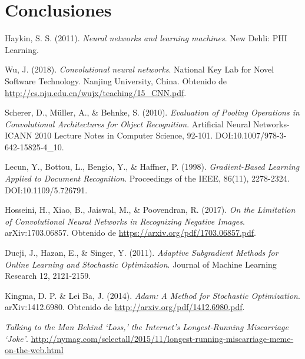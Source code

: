 \documentclass[spanish,11pt,letterpaper]{article}
\begin{document}
\section{Conclusiones}

\begin{thebibliography}{9}
Haykin, S. S. (2011).
\textit{Neural networks and learning machines}.
New Dehli: PHI Learning.

Wu, J. (2018).
\textit{Convolutional neural networks}.
National Key Lab for Novel Software Technology. Nanjing University, China.
Obtenido de \url{http://cs.nju.edu.cn/wujx/teaching/15_CNN.pdf}.

Scherer, D., M\"uller, A., \& Behnke, S. (2010).
\textit{Evaluation of Pooling Operations in Convolutional Architectures for Object Recognition}.
Artificial Neural Networks-ICANN 2010 Lecture Notes in Computer Science, 92-101. DOI:10.1007/978-3-642-15825-4\_10.

Lecun, Y., Bottou, L., Bengio, Y., \& Haffner, P. (1998).
\textit{Gradient-Based Learning Applied to Document Recognition}.
Proceedings of the IEEE, 86(11), 2278-2324. DOI:10.1109/5.726791.

Hosseini, H., Xiao, B., Jaiswal, M., \& Poovendran, R. (2017).
\textit{On the Limitation of Convolutional Neural Networks in Recognizing Negative Images}.
arXiv:1703.06857. Obtenido de \url{https://arxiv.org/pdf/1703.06857.pdf}.

Ducji, J., Hazan, E., \& Singer, Y. (2011).
\textit{Adaptive Subgradient Methods for Online Learning and Stochastic Optimization}.
Journal of Machine Learning Research 12, 2121-2159.

Kingma, D. P. \& Lei Ba, J. (2014).
\textit{Adam: A Method for Stochastic Optimization}.
arXiv:1412.6980. Obtenido de \url{http://arxiv.org/pdf/1412.6980.pdf}.

\textit{Talking to the Man Behind `Loss,' the Internet's Longest-Running Miscarriage `Joke'}.
\url{http://nymag.com/selectall/2015/11/longest-running-miscarriage-meme-on-the-web.html}

\end{thebibliography}
\end{document}
